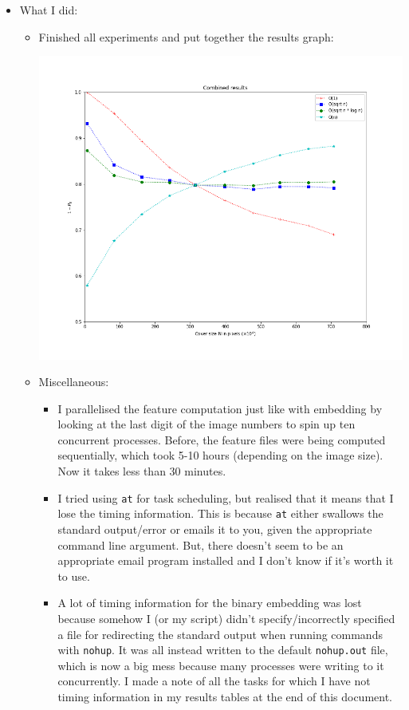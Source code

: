 \documentclass[11pt,a4paper]{report}
\begin{document}
\begin{itemize}

  \item What I did:
    \begin{itemize}
      \item Finished all experiments and put together the results graph:
        \begin{center}
          \includegraphics[width=\linewidth]{combined_graph_27_02_2019.png}
        \end{center}
      \item Miscellaneous:
        \begin{itemize}
          \item I parallelised the feature computation just like with embedding by looking at the last digit of the image numbers to spin up ten concurrent processes. Before, the feature files were being computed sequentially, which took 5-10 hours (depending on the image size). Now it takes less than 30 minutes.
          \item I tried using \texttt{at} for task scheduling, but realised that it means that I lose the timing information. This is because \texttt{at} either swallows the standard output/error or emails it to you, given the appropriate command line argument. But, there doesn't seem to be an appropriate email program installed and I don't know if it's worth it to use.
          \item A lot of timing information for the binary embedding was lost because somehow I (or my script) didn't specify/incorrectly specified a file for redirecting the standard output when running commands with \texttt{nohup}. It was all instead written to the default \texttt{nohup.out} file, which is now a big mess because many processes were writing to it concurrently. I made a note of all the tasks for which I have not timing information in my results tables at the end of this document.

\end{itemize}
\end{itemize}
\end{itemize}
\end{document}
